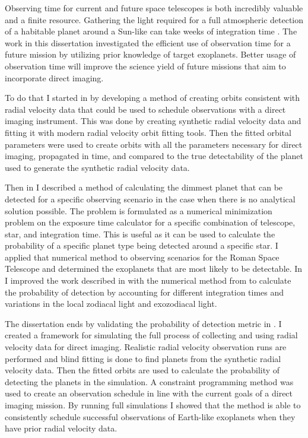 Observing time for current and future space telescopes is both incredibly
valuable and a finite resource. Gathering the light required for a full
atmospheric detection of a habitable planet around a Sun-like can take weeks of
integration time \citep{TheLUVOIRTeam2019}. The work in this dissertation
investigated the efficient use of observation time for a future mission by
utilizing prior knowledge of target exoplanets. Better usage of observation
time will improve the science yield of future missions that aim to incorporate
direct imaging.

To do that I started in  by developing a method of
creating orbits consistent with radial velocity data that could be used to
schedule observations with a direct imaging instrument. This was done by
creating synthetic radial velocity data and fitting it with modern radial
velocity orbit fitting tools. Then the fitted orbital parameters were used to
create orbits with all the parameters necessary for direct imaging, propagated
in time, and compared to the true detectability of the planet used to generate
the synthetic radial velocity data.

Then in  I described a method of calculating the dimmest
planet that can be detected for a specific observing scenario in the case when
there is no analytical solution possible. The problem is formulated as a
numerical minimization problem on the exposure time calculator for a specific
combination of telescope, star, and integration time. This is useful as it can
be used to calculate the probability of a specific planet type being detected
around a specific star. I applied that numerical method to observing scenarios
for the Roman Space Telescope and determined the exoplanets that are most
likely to be detectable. In  I improved the work
described in  with the numerical method from
 to calculate the probability of detection by accounting for
different integration times and variations in the local zodiacal light and
exozodiacal light.

The dissertation ends by validating the probability of detection metric in
. I created a framework for simulating the full
process of collecting and using radial velocity data for direct imaging.
Realistic radial velocity observation runs are performed and blind fitting is
done to find planets from the synthetic radial velocity data. Then the fitted
orbits are used to calculate the probability of detecting the planets in the
simulation. A constraint programming method was used to create an observation
schedule in line with the current goals of a direct imaging mission. By running
full simulations I showed that the method is able to consistently schedule
successful observations of Earth-like exoplanets when they have prior radial
velocity data.

